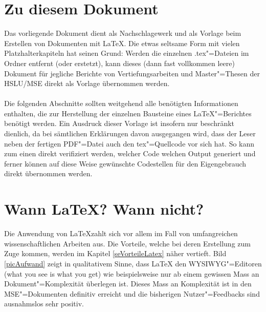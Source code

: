 %
\section{Zu diesem Dokument}
%
Das vorliegende Dokument dient als Nachschlagewerk und als Vorlage beim Erstellen von Dokumenten mit \LaTeX . Die etwas seltsame Form mit vielen Platzhalterkapiteln hat seinen Grund: Werden die einzelnen .tex"=Dateien im Ordner  entfernt (oder erstetzt), kann dieses (dann fast vollkommen leere) Dokument für jegliche Berichte von Vertiefungsarbeiten und Master"=Thesen der HSLU/MSE direkt als Vorlage übernommen werden. \\\\%
Die folgenden Abschnitte sollten weitgehend alle benötigten Informationen enthalten, die zur Herstellung der einzelnen Bausteine eines \LaTeX "=Berichtes benötigt werden. Ein Ausdruck dieser Vorlage ist insofern nur beschränkt dienlich, da bei sämtlichen Erklärungen davon ausgegangen wird, dass der Leser neben der fertigen PDF"=Datei auch den tex"=Quellcode vor sich hat. So kann zum einen direkt verifiziert werden, welcher Code welchen Output generiert und ferner können auf diese Weise gewünschte Codestellen für den Eigengebrauch direkt übernommen werden.%
%
\section{Wann \LaTeX ? Wann nicht?}%
%
Die Anwendung von \LaTeX zahlt sich vor allem im Fall von umfangreichen wissenschaftlichen Arbeiten aus. Die Vorteile, welche bei deren Erstellung zum Zuge kommen, werden im Kapitel \ref{seVorteileLatex} näher vertieft.%
%
%
%
Bild \ref{picAufwand} zeigt in qualitativem Sinne, dass \LaTeX{} den WYSIWYG"=Editoren (what you see is what you get) wie beispielsweise  nur ab einem gewissen Mass an Dokument"=Komplexität überlegen ist. Dieses Mass an Komplexität ist in den MSE"=Dokumenten definitiv erreicht und die bisherigen Nutzer"=Feedbacks sind ausnahmslos sehr positiv.%
%
